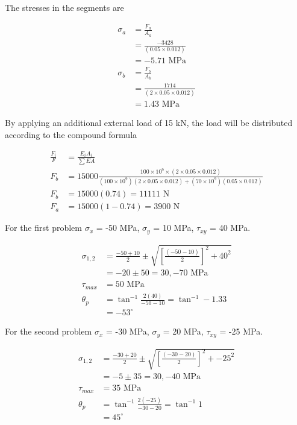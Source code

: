 \documentclass[
10pt,
a4paper,
openany,
svgnames,
]{book}
\begin{document}
\begin{exercises}
  The stresses in the segments are

  \begin{align*}
    \sigma_a &= \frac{F_a}{A_a} \\
             &= \frac{-3428}{(0.05 \times 0.012)} \\
             &= -5.71 \text{ MPa} \\
    \sigma_b &= \frac{F_b}{A_b} \\
             &= \frac{1714}{(2 \times 0.05 \times 0.012)} \\
             &= 1.43 \text{ MPa}
  \end{align*}

  By applying an additional external load of 15 kN, the load will be distributed according to the compound formula

  \begin{align*}
    \frac{F_i}{F} &= \frac{E_iA_i}{\sum EA} \\
    F_b &= 15000 \frac{100 \times 10^9 \times (2 \times 0.05 \times 0.012)}{(100 \times 10^9)(2 \times 0.05 \times 0.012) + (70 \times 10^9)(0.05 \times 0.012)} \\
    F_b &= 15000(0.74) = 11111 \text{ N} \\
    F_a &= 15000(1 - 0.74) = 3900 \text{ N}
  \end{align*}

\item For the first problem $\sigma_x$ = -50 MPa, $\sigma_y$ = 10 MPa, $\tau_{xy}$ = 40 MPa.
  
  \begin{align*}
    \sigma_{1,2} &= \frac{-50 + 10}{2} \pm \sqrt{ \left[ \frac{(-50 - 10)}{2}\right]^2 + 40^2} \\
                 &= -20 \pm 50 = 30, -70 \text{ MPa} \\
    \tau_{max} &= 50 \text{ MPa} \\
    \theta_p &= \tan^{-1} \frac{2(40)}{-50-10} = \tan^{-1} -1.33 \\
                 &= -53^{\circ}
  \end{align*}

  For the second problem $\sigma_x$ = -30 MPa, $\sigma_y$ = 20 MPa, $\tau_{xy}$ = -25 MPa.

  \begin{align*}
    \sigma_{1,2} &= \frac{-30 + 20}{2} \pm \sqrt{ \left[ \frac{(-30 - 20)}{2}\right]^2 + -25^2} \\
                 &= -5 \pm 35 = 30, -40 \text{ MPa} \\
    \tau_{max} &= 35 \text{ MPa} \\
    \theta_p &= \tan^{-1} \frac{2(-25)}{-30-20} = \tan^{-1} 1 \\
                 &= 45^{\circ}
  \end{align*}


\end{exercises}
\end{document}
